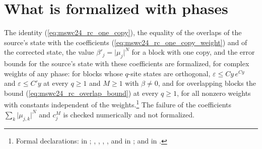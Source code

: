 \documentclass{article}
\begin{document}
\section{What is formalized with phases}
The identity (\ref{eq:mswc24_rc_one_copy}), the equality of the overlaps of the source's state
with the coefficients (\ref{eq:mswc24_rc_one_copy_weight}) and of the corrected state, the value
$\beta'_j=\lvert\mu_j\rvert^N$ for a block with one copy, and the error bounds for the source's
state with these coefficients are formalized, for complex weights of any phase: for blocks
whose $q$-site states are orthogonal, $\varepsilon\leq Cy\,e^{Cy}$ and $\varepsilon\leq C'y$
at every $q\geq1$ and $M\geq1$ with $\beta\neq0$, and for overlapping blocks the bound
(\ref{eq:mswc24_rc_overlap_bound}) at every $q\geq1$, for all nonzero weights with constants
independent of the weights.\footnote{Formal declarations:
     in ;
    ,
    ,
    ,
    ,
     and
    in ;
     and
     in
    .} The failure of the coefficients
$\sum_k\lvert\mu_{j,k}\rvert^N$ and $c_j^M$ is checked numerically and not formalized.



\end{document}
